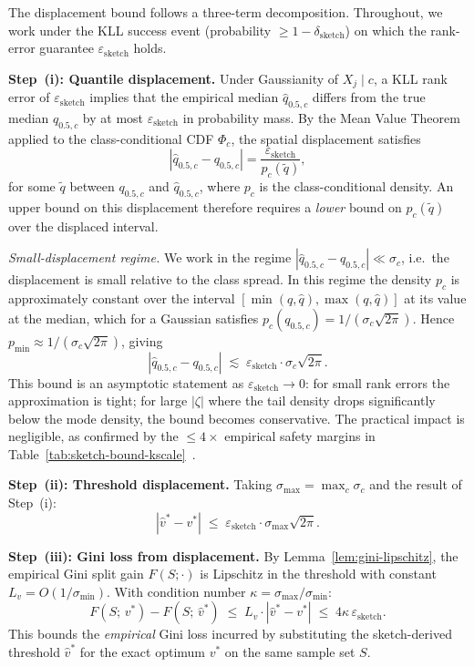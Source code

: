 \documentclass{article}
\begin{document}
The displacement bound follows a three-term decomposition.
Throughout, we work under the KLL success event (probability
$\geq 1-\delta_{\mathrm{sketch}}$) on which the rank-error guarantee
$\varepsilon_{\mathrm{sketch}}$ holds.

\textbf{Step~(i): Quantile displacement.}
Under Gaussianity of $X_j \mid c$, a KLL rank error of
$\varepsilon_{\mathrm{sketch}}$ implies that the empirical median
$\hat{q}_{0.5,c}$ differs from the true median $q_{0.5,c}$ by at most
$\varepsilon_{\mathrm{sketch}}$ in probability mass.
By the Mean Value Theorem applied to the class-conditional CDF
$\Phi_c$, the spatial displacement satisfies
\[
  |\hat{q}_{0.5,c} - q_{0.5,c}|
  = \frac{\varepsilon_{\mathrm{sketch}}}{p_c(\tilde{q})},
\]
for some $\tilde{q}$ between $q_{0.5,c}$ and $\hat{q}_{0.5,c}$,
where $p_c$ is the class-conditional density.
An upper bound on this displacement therefore requires a
\emph{lower} bound on $p_c(\tilde{q})$ over the displaced interval.

\textit{Small-displacement regime.}
We work in the regime $|\hat{q}_{0.5,c}-q_{0.5,c}| \ll \sigma_c$,
i.e.\ the displacement is small relative to the class spread.
In this regime the density $p_c$ is approximately constant over the
interval $[\min(q,\hat{q}),\max(q,\hat{q})]$ at its value at the
median, which for a Gaussian satisfies
$p_c(q_{0.5,c}) = 1/(\sigma_c\sqrt{2\pi})$.
Hence $p_{\min} \approx 1/(\sigma_c\sqrt{2\pi})$, giving
\[
  |\hat{q}_{0.5,c} - q_{0.5,c}|
  \;\lesssim\;
  \varepsilon_{\mathrm{sketch}} \cdot \sigma_c\sqrt{2\pi}.
\]
This bound is an asymptotic statement as
$\varepsilon_{\mathrm{sketch}}\to 0$: for small rank errors the
approximation is tight; for large $|\zeta|$ where the tail density
drops significantly below the mode density, the bound becomes
conservative.
The practical impact is negligible, as confirmed by the
$\leq 4{\times}$ empirical safety margins in
Table~\ref{tab:sketch-bound-kscale}~\citep{Karnin2016}.

\textbf{Step~(ii): Threshold displacement.}
Taking $\sigma_{\max} = \max_c \sigma_c$ and the result of Step~(i):
\[
  |\hat{v}^* - v^*|
  \;\leq\;
  \varepsilon_{\mathrm{sketch}} \cdot \sigma_{\max}\sqrt{2\pi}.
\]

\textbf{Step~(iii): Gini loss from displacement.}
By Lemma~\ref{lem:gini-lipschitz}, the empirical Gini split gain
$F(S;\cdot)$ is Lipschitz in the threshold with constant
$L_v = O(1/\sigma_{\min})$.
With condition number $\kappa = \sigma_{\max}/\sigma_{\min}$:
\[
  F(S;\,v^*) - F(S;\,\hat{v}^*)
  \;\leq\; L_v \cdot |\hat{v}^* - v^*|
  \;\leq\; 4\kappa\,\varepsilon_{\mathrm{sketch}}.
\]
This bounds the \emph{empirical} Gini loss incurred by substituting
the sketch-derived threshold $\hat{v}^*$ for the exact optimum $v^*$
on the same sample set $S$.
\end{document}
